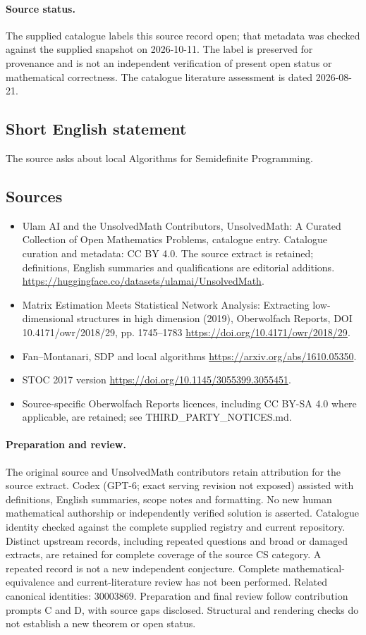 \documentclass[11pt]{article}
\begin{document}
\paragraph{Source status.}
The supplied catalogue labels this source record open; that metadata was checked against the supplied snapshot on 2026-10-11. The label is preserved for provenance and is not an independent verification of present open status or mathematical correctness. The catalogue literature assessment is dated 2026-08-21.
\subsection{Short English statement}
The source asks about local Algorithms for Semidefinite Programming.
\subsection{Sources}
\begin{itemize}
\item[\hypertarget{source:statement:1}{S1}] Ulam AI and the UnsolvedMath Contributors, UnsolvedMath: A Curated Collection of Open Mathematics Problems, catalogue entry. Catalogue curation and metadata: CC BY 4.0. The source extract is retained; definitions, English summaries and qualifications are editorial additions.
\url{https://huggingface.co/datasets/ulamai/UnsolvedMath}.
\item[\hypertarget{source:statement:2}{S2}] Matrix Estimation Meets Statistical Network Analysis: Extracting low-dimensional structures in high dimension (2019), Oberwolfach Reports, DOI 10.4171/owr/2018/29, pp. 1745--1783
\url{https://doi.org/10.4171/owr/2018/29}.
\item[\hypertarget{source:statement:3}{S3}] Fan--Montanari, SDP and local algorithms
\url{https://arxiv.org/abs/1610.05350}.
\item[\hypertarget{source:statement:4}{S4}] STOC 2017 version
\url{https://doi.org/10.1145/3055399.3055451}.
\item Source-specific Oberwolfach Reports licences, including CC BY-SA 4.0 where applicable, are retained; see THIRD\_PARTY\_NOTICES.md.
\end{itemize}
\paragraph{Preparation and review.}
The original source and UnsolvedMath contributors retain attribution for the source extract. Codex (GPT-6; exact serving revision not exposed) assisted with definitions, English summaries, scope notes and formatting. No new human mathematical authorship or independently verified solution is asserted. Catalogue identity checked against the complete supplied registry and current repository. Distinct upstream records, including repeated questions and broad or damaged extracts, are retained for complete coverage of the source CS category. A repeated record is not a new independent conjecture. Complete mathematical-equivalence and current-literature review has not been performed. Related canonical identities: 30003869. Preparation and final review follow contribution prompts C and D, with source gaps disclosed. Structural and rendering checks do not establish a new theorem or open status.
\label{end:statement}
\end{document}

